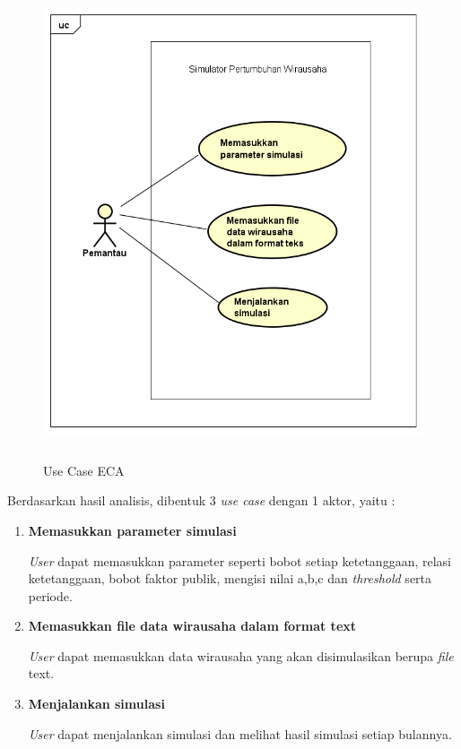 	\begin{figure} [H]
		\centering  
		\includegraphics[width=14cm, height=14cm]{usecase1} 
		\caption[Use Case ECA]{Use Case ECA} 
		\label{fig:usecase} 
	\end{figure}
	
Berdasarkan hasil analisis, dibentuk 3 \textit{use case} dengan 1 aktor, yaitu :
\begin{enumerate}
	\item \textbf{Memasukkan parameter simulasi}
	
	\textit{User} dapat memasukkan parameter seperti bobot setiap ketetanggaan, relasi ketetanggaan, bobot faktor publik, mengisi nilai a,b,c dan \textit{threshold} serta periode.
	\item \textbf{Memasukkan file data wirausaha dalam format text}
	
	\textit{User} dapat memasukkan data wirausaha yang akan disimulasikan berupa \textit{file} text.
	\item \textbf{Menjalankan simulasi}
	
	\textit{User} dapat menjalankan simulasi dan melihat hasil simulasi setiap bulannya.
\end{enumerate}

